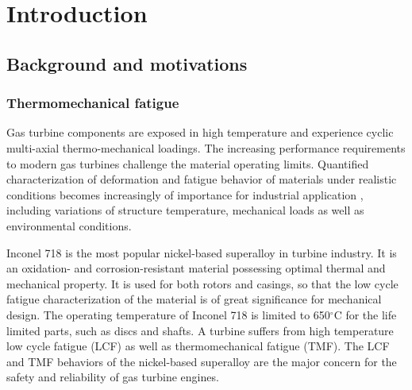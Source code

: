 ﻿\chapter{Introduction}
\section{Background and motivations}
\noindent
\subsection{Thermomechanical fatigue}
\noindent
Gas turbine components are exposed in high temperature and experience cyclic multi-axial thermo-mechanical loadings. The increasing performance requirements to modern gas turbines challenge the material operating limits. Quantified characterization of deformation and fatigue behavior of materials under realistic conditions becomes increasingly of importance for industrial application \cite{harrison1996modelling}, including variations of structure temperature, mechanical loads as well as environmental conditions. 

Inconel 718 is the most popular nickel-based superalloy in turbine industry. It is an oxidation- and corrosion-resistant material possessing optimal thermal and mechanical property. 
It is used for both rotors and casings, so that the low cycle fatigue characterization of the material is of great significance for mechanical design. The operating temperature of Inconel 718 is limited to 650$^\circ$C for the life limited parts, such as discs and shafts.
A turbine suffers from high temperature low cycle fatigue (LCF) as well as thermomechanical fatigue (TMF).
The LCF and TMF behaviors of the nickel-based superalloy are the major concern for the safety and reliability of gas turbine engines.


